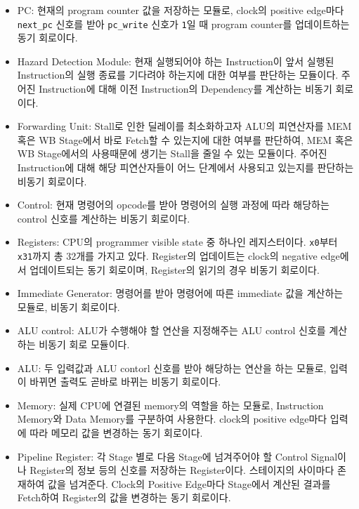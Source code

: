 \documentclass[openright, a4paper]{article}
\newcommand{\code}[1]{\texttt{#1}}
\begin{document}
\begin{itemize}
    \item PC: 현재의 program counter 값을 저장하는 모듈로, clock의 positive 
    edge마다 \code{next_pc} 신호를 받아 \code{pc_write} 신호가 \code{1}일 때 
    program counter를 업데이트하는 동기 회로이다.

    \item Hazard Detection Module: 현재 실행되어야 하는 Instruction이 앞서 실행된 Instruction의 실행 종료를 기다려야 하는지에 대한 여부를 판단하는 모듈이다. 주어진 Instruction에 대해 이전 Instruction의 Dependency를 계산하는 비동기 회로이다.

    \item Forwarding Unit: Stall로 인한 딜레이를 최소화하고자 ALU의 피연산자를 MEM 혹은 WB Stage에서 바로 Fetch할 수 있는지에 대한 여부를 판단하여, MEM 혹은 WB Stage에서의 사용때문에 생기는 Stall을 줄일 수 있는 모듈이다. 주어진 Instruction에 대해 해당 피연산자들이 어느 단계에서 사용되고 있는지를 판단하는 비동기 회로이다.
    
    \item Control: 현재 명령어의 opcode를 받아 명령어의 실행 과정에 따라 
    해당하는 control 신호를 계산하는 비동기 회로이다.
    
    \item Registers: CPU의 programmer visible state 중 하나인 레지스터이다. 
    \code{x0}부터 \code{x31}까지 총 32개를 가지고 있다. Register의 업데이트는 clock의 negative 
    edge에서 업데이트되는 동기 회로이며, Register의 읽기의 경우 비동기 회로이다.

    \item Immediate Generator: 명령어를 받아 명령어에 따른 immediate 값을 계산하는 모듈로, 
    비동기 회로이다.

    \item ALU control: ALU가 수행해야 할 연산을 지정해주는 ALU control 신호를 
    계산하는 비동기 회로 모듈이다.

    \item ALU: 두 입력값과 ALU contorl 신호를 받아 해당하는 연산을 하는 
    모듈로, 입력이 바뀌면 출력도 곧바로 바뀌는 비동기 회로이다.

    \item Memory: 실제 CPU에 연결된 memory의 역할을 하는 모듈로, Instruction Memory와 Data Memory를 구분하여 사용한다. clock의 positive edge마다 입력에 따라 메모리 값을 변경하는 동기 회로이다.

    \item Pipeline Register: 각 Stage 별로 다음 Stage에 넘겨주어야 할 Control Signal이나 Register의 정보 등의 신호를 저장하는 Register이다. 스테이지의 사이마다 존재하여 값을 넘겨준다. Clock의 Positive Edge마다 Stage에서 계산된 결과를 Fetch하여 Register의 값을 변경하는 동기 회로이다.
\end{itemize}
\end{document}
